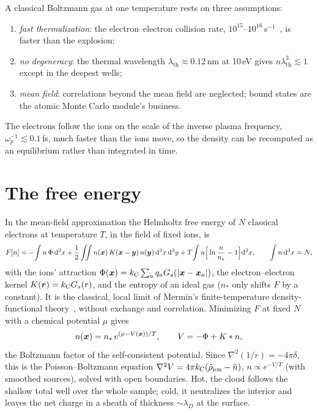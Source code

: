 A classical Boltzmann gas at one temperature rests on three assumptions:
\begin{enumerate}
  \item \emph{fast thermalization}: the electron--electron collision rate, $10^{15}$--$10^{16}$\,s$^{-1}$~\cite{nrl}, is
    faster than the explosion;
  \item \emph{no degeneracy}: the thermal wavelength $\lambda_{\mathrm{th}}\approx0.12$\,nm at 10\,eV gives
    $n\lambda_{\mathrm{th}}^3\lesssim1$ except in the deepest wells;
  \item \emph{mean field}: correlations beyond the mean field are neglected; bound states are the atomic Monte Carlo
    module's business.
\end{enumerate}
The electrons follow the ions on the scale of the inverse plasma frequency, $\omega_p^{-1}\lesssim0.1$\,fs, much
faster than the ions move, so the density can be recomputed as an equilibrium rather than integrated in time.

\section{The free energy}

In the mean-field approximation the Helmholtz free energy of $N$ classical electrons at temperature $T$, in the field
of fixed ions, is
\begin{equation}
  F[n] = -\!\int n\,\Phi\,\mathrm{d}^3x
        + \frac12\iint n(\bm{x})\,K(\bm{x}-\bm{y})\,n(\bm{y})\,\mathrm{d}^3x\,\mathrm{d}^3y
        + T\!\int n\Big[\ln\frac{n}{n_\ast}-1\Big]\mathrm{d}^3x,\qquad \int n\,\mathrm{d}^3x = N,
  \label{eq:F}
\end{equation}
with the ions' attraction $\Phi(\bm{x}) = k_{\mathrm C}\sum_a q_a G_s(|\bm{x}-\bm{x}_a|)$, the electron--electron kernel
$K(\bm{r}) = k_{\mathrm C} G_s(r)$, and the entropy of an ideal gas ($n_\ast$ only shifts $F$ by a constant).
It is the classical, local limit of Mermin's finite-temperature density-functional theory~\cite{mermin1965}, without
exchange and correlation.
Minimizing $F$ at fixed $N$ with a chemical potential $\mu$ gives
\begin{equation}
  n(\bm{x}) = n_\ast\,e^{(\mu - V(\bm{x}))/T},\qquad V = -\Phi + K*n,
  \label{eq:boltzmann}
\end{equation}
the Boltzmann factor of the self-consistent potential.
Since $\nabla^2(1/r) = -4\pi\delta$, this is the Poisson--Boltzmann equation
$\nabla^2V = 4\pi k_{\mathrm C}(\tilde\rho_{\mathrm{ion}}-\tilde n)$, $n\propto e^{-V/T}$ (with smoothed sources), solved with
open boundaries.
Hot, the cloud follows the shallow total well over the whole sample; cold, it neutralizes the interior and leaves the
net charge in a sheath of thickness $\sim\lambda_D$ at the surface.

